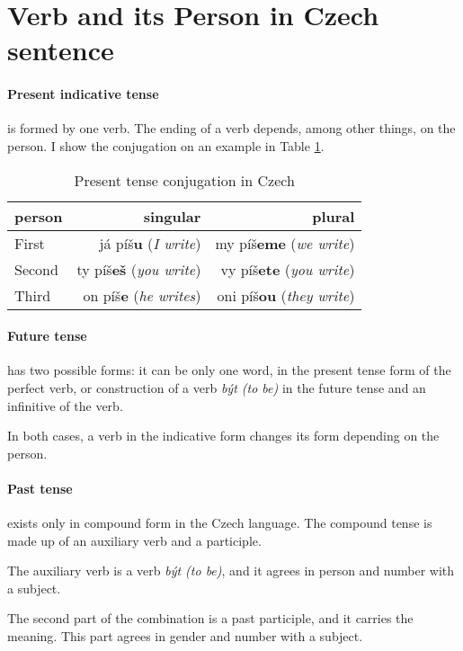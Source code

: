 \section{Verb and its Person in Czech sentence}

\paragraph{Present indicative tense} is formed by one verb. The ending of a verb depends, among other things, on the person. I show the conjugation on an example in Table \ref{tab:present}.

\begin{table}[!ht]
	\caption{Present tense conjugation in Czech}
	\label{tab:present}
	\begin{center}
		\begin{tabular}{l|r|r}
			person & singular & plural \\
			\hline
			First & já píš\textbf{u} (\emph{I write}) & my píš\textbf{eme} (\emph{we write}) \\
			Second & ty píš\textbf{eš} (\emph{you write}) & vy píš\textbf{ete} (\emph{you write})  \\
			Third & on píš\textbf{e} (\emph{he writes}) & oni píš\textbf{ou} (\emph{they write})  \\
		\end{tabular}
	\end{center}
\end{table}

\paragraph{Future tense} has two possible forms: it can be only one word, in the present tense form of the perfect verb, or construction of a verb \emph{být (to be)} in the future tense and an infinitive of the verb.

In both cases, a verb in the indicative form changes its form depending on the person.

\paragraph{Past tense} exists only in compound form in the Czech language. The compound tense is made up of an auxiliary verb and a participle.

The auxiliary verb is a verb \emph{být (to be)}, and it agrees in person and number with a subject.

The second part of the combination is a past participle, and it carries the meaning. This part agrees in gender and number with a subject.

